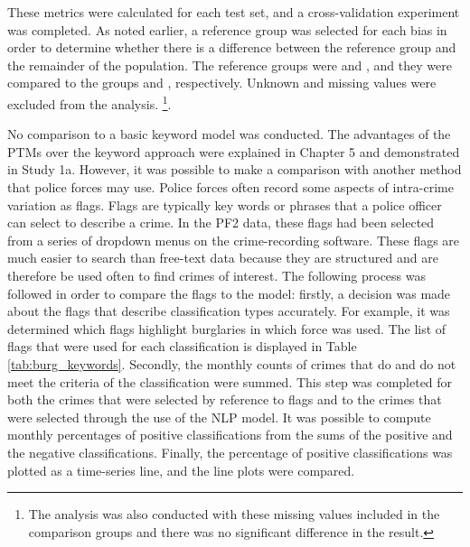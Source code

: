 These metrics were calculated for each test set, and a cross-validation experiment was completed. As noted earlier, a reference group was selected for each bias in order to determine whether there is a difference between the reference group and the remainder of the population. The reference groups were  and , and they were compared to the groups  and , respectively. Unknown and missing values were excluded from the analysis.  \footnote{The analysis was also conducted with these missing values included in the comparison groups and there was no significant difference in the result.}. 

No comparison to a basic keyword model was conducted. The advantages of the PTMs over the keyword approach were explained in Chapter 5 and demonstrated in Study 1a. However, it was possible to make a comparison with another method that police forces may use. Police forces often record some aspects of intra-crime variation as flags. Flags are typically key words or phrases that a police officer can select to describe a crime. In the PF2 data, these flags had been selected from a series of dropdown menus on the crime-recording software. These flags are much easier to search than free-text data because they are structured and are therefore be used often to find crimes of interest. The following process was followed in order to compare the flags to the model: firstly, a decision was made about the flags that describe classification types accurately. For example, it was determined which flags highlight burglaries in which force was used. The list of flags that were used for each classification is displayed in Table \ref{tab:burg_keywords}. Secondly, the monthly counts of crimes that do and do not meet the criteria of the classification were summed. This step was completed for both the crimes that were selected by reference to flags and to the crimes that were selected through the use of the NLP model. It was possible to compute monthly percentages of positive classifications from the sums of the positive and the negative classifications. Finally, the percentage of positive classifications was plotted as a time-series line, and the line plots were compared.


